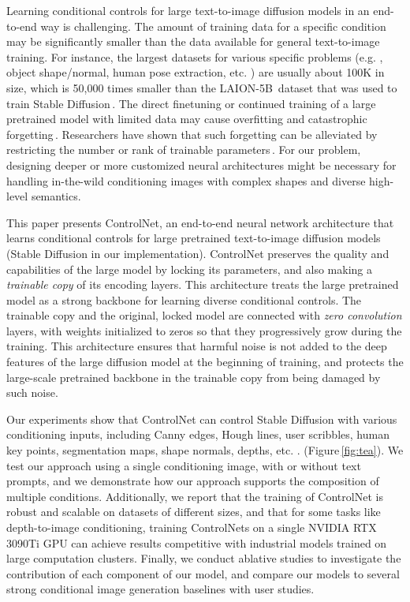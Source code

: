 	Learning conditional controls for large text-to-image diffusion models in an end-to-end way is challenging.  The amount of training data for a specific condition may be significantly smaller than the data available for general text-to-image training. For instance, the largest datasets for various specific problems (e.g. , object shape/normal, human pose extraction, etc. ) are usually about 100K in size, which is 50,000 times smaller than the
	LAION-5B\,\cite{schuhmann2022laionb} dataset that was used to train Stable Diffusion\,\cite{sd15}. The direct finetuning or continued training of a large pretrained model with limited data may cause overfitting and catastrophic
	forgetting\,\cite{hu2021lora,ruiz2022dreambooth}.
	Researchers have shown that such forgetting can be alleviated by restricting the number or rank of trainable parameters\,\cite{chen2022vision,ha2017hypernetworks,hu2021lora,zhang2020side}.
	For our problem, designing deeper or more customized neural architectures might be necessary for handling in-the-wild conditioning images with complex shapes and diverse high-level semantics.

	This paper presents ControlNet, an end-to-end neural network architecture that learns conditional controls for large pretrained text-to-image diffusion models (Stable Diffusion in our implementation).  ControlNet preserves the quality and capabilities of the large model by locking its parameters, and also making a {\em trainable copy} of its encoding layers. This architecture treats the large pretrained model as a strong backbone for learning diverse conditional controls.  The trainable copy and the original, locked model are connected with {\em zero convolution} layers, with weights initialized to zeros so that they progressively grow during the training. This architecture ensures that harmful noise is not added to the deep features of the large diffusion model at the beginning of training, and protects the large-scale pretrained backbone in the trainable copy from being damaged by such noise.

	Our experiments show that ControlNet can control Stable Diffusion with various conditioning inputs, including Canny edges, Hough lines, user scribbles, human key points, segmentation maps, shape normals, depths, etc. . (Figure\,\ref{fig:tea}).  We test our approach using a single conditioning image, with or without text prompts, and we demonstrate how our approach supports the composition of multiple conditions.  Additionally, we report that the training of ControlNet is robust and scalable on datasets of different sizes, and that for some tasks like depth-to-image conditioning, training ControlNets on a single NVIDIA RTX 3090Ti GPU can achieve results competitive with industrial models trained on large computation clusters.  Finally, we conduct ablative studies to investigate the contribution of each component of our model, and compare our models to several strong conditional image generation baselines with user studies.

